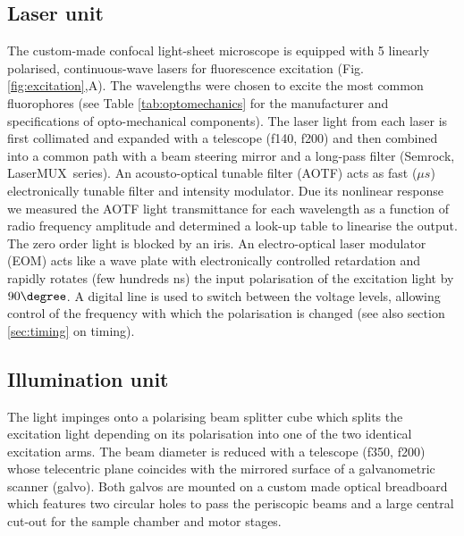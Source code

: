 \documentclass[12pt]{spieman}  %
\begin{document}
\subsection{Laser unit}		
The custom-made confocal light-sheet microscope is equipped with 5 linearly polarised, continuous-wave lasers for fluorescence excitation (Fig. \ref{fig:excitation},A). The wavelengths were chosen to excite the most common fluorophores (see Table \ref{tab:optomechanics} for the manufacturer and specifications of opto-mechanical components). The laser light from each laser is first collimated and expanded with a telescope (f140, f200) and then combined into a common path with a beam steering mirror and a long-pass filter (Semrock, LaserMUX\texttrademark\ series). An acousto-optical tunable filter (AOTF) acts as fast ($\mu s$) electronically tunable filter and intensity modulator. %
Due its nonlinear response we measured the AOTF light transmittance for each wavelength as a function of radio frequency amplitude and determined a look-up table to linearise the output. The zero order light is blocked by an iris. An electro-optical laser modulator (EOM) acts like a wave plate with electronically controlled retardation and rapidly rotates (few hundreds ns) the input polarisation of the excitation light by $90\degree$. %
A digital line is used to switch between the voltage levels, allowing control of the frequency with which the polarisation is changed (see also section \ref{sec:timing} on timing).

\subsection{Illumination unit}		
The light impinges onto a polarising beam splitter cube which splits the excitation light depending on its polarisation into one of the two identical excitation arms. The beam diameter is reduced with a telescope (f350, f200) whose telecentric plane coincides with the mirrored surface of a galvanometric scanner (galvo). Both galvos are mounted on a custom made optical breadboard which features two circular holes to pass the periscopic beams and a large central cut-out for the sample chamber and motor stages. 
\end{document}
